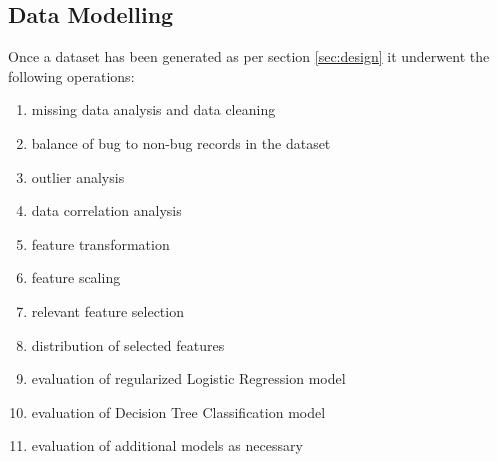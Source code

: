 \subsection{Data Modelling}

Once a dataset has been generated as per section \ref{sec:design} it underwent the following operations:
\begin{enumerate}
    \item missing data analysis and data cleaning \label{lst:dataset-ops.item:data-cleaning}
    \item balance of bug to non-bug records in the dataset \label{lst:dataset-ops.item:bug-to-non-bug-balance}
    \item outlier analysis \label{lst:dataset-ops.item:outliers}
    \item data correlation analysis \label{lst:dataset-ops.item:data-correlation}
    \item feature transformation \label{lst:dataset-ops.item:feature-transformation}
    \item feature scaling \label{lst:dataset-ops.item:data-scaling}
    \item relevant feature selection \label{lst:dataset-ops.item:feature-selection}
    \item distribution of selected features \label{lst:dataset-ops.item:attribute-distribution}
    \item evaluation of regularized Logistic Regression model \label{lst:dataset-ops.item:ml-logistic-regression}
    \item evaluation of Decision Tree Classification model \label{lst:dataset-ops.item:ml-decision-tree}
    \item evaluation of additional models as necessary \label{lst:dataset-ops.item:ml-models-additional}
\end{enumerate}


